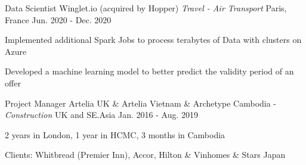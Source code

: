 \begin{cventries}
  \cventry
    {Data Scientist} %
    {Winglet.io (acquired by Hopper) \emph{Travel - Air Transport}} %
    {Paris, France} %
    {Jun. 2020 - Dec. 2020} %
    {
      \begin{cvitems} %
       \item {Implemented additional Spark Jobs to process terabytes of Data with clusters on Azure}
       \item {Developed a machine learning model to better predict the validity period of an offer }
      \end{cvitems}
    }

  \cventry
    {Project Manager} %
    {Artelia UK \& Artelia Vietnam \& Archetype Cambodia - \emph{Construction}} %
    {UK and SE.Asia} %
    {Jan. 2016 - Aug. 2019} %
    {
      \begin{cvitems} %
        \item {2 years in London, 1 year in HCMC, 3 months in Cambodia}
        \item {Clients: Whitbread (Premier Inn), Accor, Hilton \& Vinhomes \& Stars Japan} 
      \end{cvitems}
    }

\end{cventries}
